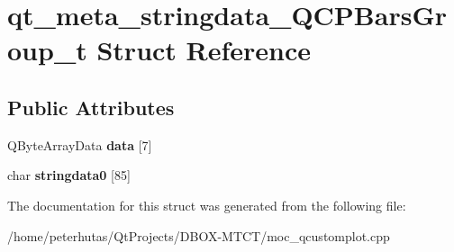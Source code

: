 \hypertarget{structqt__meta__stringdata___q_c_p_bars_group__t}{}\section{qt\+\_\+meta\+\_\+stringdata\+\_\+\+Q\+C\+P\+Bars\+Group\+\_\+t Struct Reference}
\label{structqt__meta__stringdata___q_c_p_bars_group__t}
\subsection*{Public Attributes}
\begin{DoxyCompactItemize}
\item 
\mbox{\label{structqt__meta__stringdata___q_c_p_bars_group__t_a4af132fa7aa52aa1a2e32fed4547ee11}} 
Q\+Byte\+Array\+Data {\bfseries data} \mbox{[}7\mbox{]}
\item 
\mbox{\label{structqt__meta__stringdata___q_c_p_bars_group__t_a2dd46435dea832cba9d6432a1b729650}} 
char {\bfseries stringdata0} \mbox{[}85\mbox{]}
\end{DoxyCompactItemize}


The documentation for this struct was generated from the following file\+:\begin{DoxyCompactItemize}
\item 
/home/peterhutas/\+Qt\+Projects/\+D\+B\+O\+X-\/\+M\+T\+C\+T/moc\+\_\+qcustomplot.\+cpp\end{DoxyCompactItemize}
